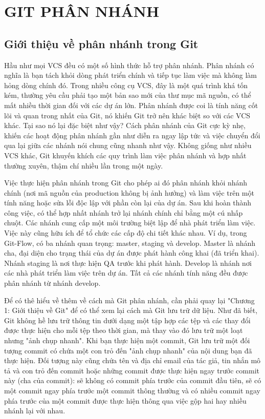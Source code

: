 \chapter{GIT PHÂN NHÁNH}
\section{Giới thiệu về phân nhánh trong Git}

Hầu như mọi VCS đều có một số hình thức hỗ trợ phân nhánh. Phân nhánh có nghĩa là bạn tách khỏi dòng phát triển chính và tiếp tục làm việc mà không làm hỏng dòng chính đó. Trong nhiều công cụ VCS, đây là một quá trình khá tốn kém, thường yêu cầu phải tạo một bản sao mới của thư mục mã nguồn, có thể mất nhiều thời gian đối với các dự án lớn. Phân nhánh được coi là tính năng cốt lõi và quan trong nhất của Git, nó khiến Git trở nên khác biệt so với các VCS khác. Tại sao nó lại đặc biệt như vậy? Cách phân nhánh của Git cực kỳ nhẹ, khiến các hoạt động phân nhánh gần như diễn ra ngay lập tức và việc chuyển đổi qua lại giữa các nhánh nói chung cũng nhanh như vậy. Không giống như nhiều VCS khác, Git khuyến khích các quy trình làm việc phân nhánh và hợp nhất thường xuyên, thậm chí nhiều lần trong một ngày. 

Việc thực hiện phân nhánh trong Git cho phép ai đó phân nhánh khỏi nhánh chính (nơi mã nguồn của production không bị ảnh hưởng) và làm việc trên một tính năng hoặc sửa lỗi độc lập với phần còn lại của dự án. Sau khi hoàn thành công việc, có thể hợp nhất nhánh trở lại nhánh chính chỉ bằng một cú nhấp chuột. Các nhánh cung cấp một môi trường biệt lập để nhà phát triển làm việc. Việc này cũng hữu ích để tổ chức các cấp độ chi tiết khác nhau. Ví dụ, trong Git-Flow, có ba nhánh quan trọng: master, staging và develop. Master là nhánh cha, đại diện cho trạng thái của dự án được phát hành công khai (đã triển khai). Nhánh staging là nơi thực hiện QA trước khi phát hành. Develop là nhánh nơi các nhà phát triển làm việc trên dự án. Tất cả các nhánh tính năng đều được phân nhánh từ nhánh develop.

Để có thê hiểu về thêm về cách mà Git phân nhánh, cần phải quay lại "Chương 1: Giới thiệu về Git" để có thể xem lại cách mà Git lưu trữ dữ liệu. Như đã biết, Git không hề lưu trữ thông tin dưới dạng một tập hợp các tệp và các thay đổi được thực hiện cho mỗi tệp theo thời gian, mà thay vào đó lưu trữ một loạt nhưng "ảnh chụp nhanh". Khi bạn thực hiện một commit, Git lưu trữ một đối tượng commit có chứa một con trỏ đến "ảnh chụp nhanh" của nội dung bạn đã thực hiện. Đối tượng này cũng chứa tên và địa chỉ email của tác giả, tin nhắn mô tả và con trỏ đến commit hoặc những commit được thực hiện ngay trước commit này (cha của commit): sẽ không có commit phía trước của commit đầu tiên, sẽ có một commit ngay phía trước một commit thông thường và có nhiều commit ngay phía trước của một commit được thực hiện thông qua việc gộp hai hay nhiều nhánh lại với nhau.


